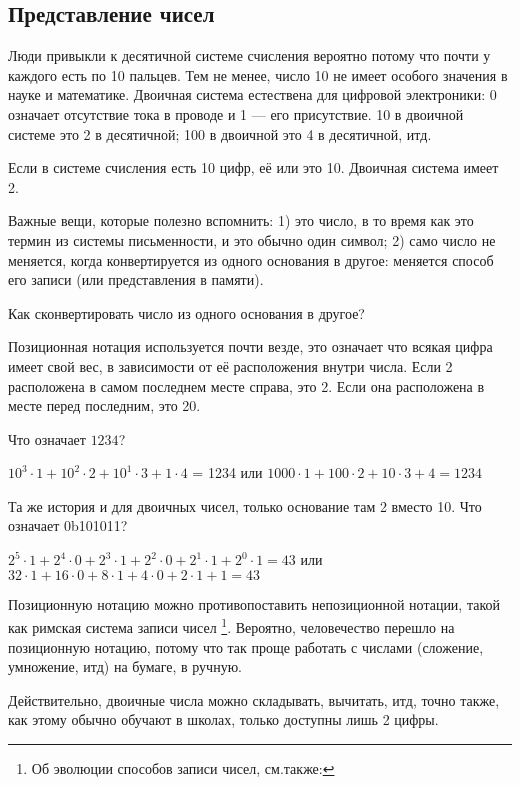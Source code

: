 \subsection{Представление чисел}

Люди привыкли к десятичной системе счисления вероятно потому что почти у каждого есть по 10 пальцев.
Тем не менее, число 10 не имеет особого значения в науке и математике.
Двоичная система естествена для цифровой электроники: 0 означает отсутствие тока в проводе и 1 --- его присутствие.
10 в двоичной системе это 2 в десятичной; 100 в двоичной это 4 в десятичной, итд.

Если в системе счисления есть 10 цифр, её  или  это 10.
Двоичная система имеет  2.

Важные вещи, которые полезно вспомнить:
1)  это число, в то время как  это термин из системы письменности, и это обычно один символ;
2) само число не меняется, когда конвертируется из одного основания в другое: меняется способ его записи (или представления
в памяти).

Как сконвертировать число из одного основания в другое?

Позиционная нотация используется почти везде, это означает что всякая цифра имеет свой вес, в зависимости от её расположения
внутри числа.
Если 2 расположена в самом последнем месте справа, это 2.
Если она расположена в месте перед последним, это 20.

Что означает $1234$?

$10^3 \cdot 1 + 10^2 \cdot 2 + 10^1 \cdot 3 + 1 \cdot 4$ = 1234 или
$1000 \cdot 1 + 100 \cdot 2 + 10 \cdot 3 + 4 = 1234$

Та же история и для двоичных чисел, только основание там 2 вместо 10.
Что означает 0b101011?

$2^5 \cdot 1 + 2^4 \cdot 0 + 2^3 \cdot 1 + 2^2 \cdot 0 + 2^1 \cdot 1 + 2^0 \cdot 1 = 43$ или
$32 \cdot 1 + 16 \cdot 0 + 8 \cdot 1 + 4 \cdot 0 + 2 \cdot 1 + 1 = 43$

Позиционную нотацию можно противопоставить непозиционной нотации, такой как римская система записи чисел
\footnote{Об эволюции способов записи чисел, см.также: }.
Вероятно, человечество перешло на позиционную нотацию, потому что так проще работать с числами (сложение, умножение, итд)
на бумаге, в ручную.

Действительно, двоичные числа можно складывать, вычитать, итд, точно также, как этому обычно обучают в школах,
только доступны лишь 2 цифры.

